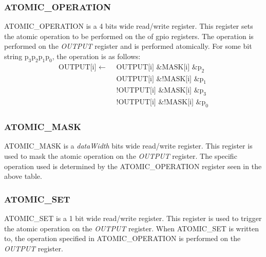 % 
\subsubsection{ATOMIC\_OPERATION}
ATOMIC\_OPERATION is a 4 bits wide read/write register. This register sets the atomic operation to be performed on the
of gpio registers. The operation is performed on the \textit{OUTPUT} register and is performed atomically.\newline\newline
For some bit string $\text{p}_3\text{p}_2\text{p}_1\text{p}_0$, the operation is as follows:
\begin{equation*}
  \begin{split}
    \text{OUTPUT[i] }\leftarrow\text{ }&\text{OUTPUT[i]} \text{ \& } \text{MASK[i]} \text{ \& } \text{p}_2\\
                        &\text{OUTPUT[i]} \text{ \& } \text{!MASK[i]} \text{ \& } \text{p}_1\\
                        &\text{!OUTPUT[i]} \text{ \& } \text{MASK[i]} \text{ \& } \text{p}_3\\
                        &\text{!OUTPUT[i]} \text{ \& } \text{!MASK[i]} \text{ \& } \text{p}_0
  \end{split}
\end{equation*}


\subsubsection{ATOMIC\_MASK}
ATOMIC\_MASK is a \textit{dataWidth} bits wide read/write register. This register is used to mask the atomic operation on the \textit{OUTPUT} register. 
The specific operation used is determined by the ATOMIC\_OPERATION register seen in the above table.

\subsubsection{ATOMIC\_SET}
ATOMIC\_SET is a 1 bit wide read/write register. This register is used to trigger the atomic operation on the \textit{OUTPUT} register. 
When ATOMIC\_SET is written to, the operation specified in ATOMIC\_OPERATION is performed on the \textit{OUTPUT} register.

